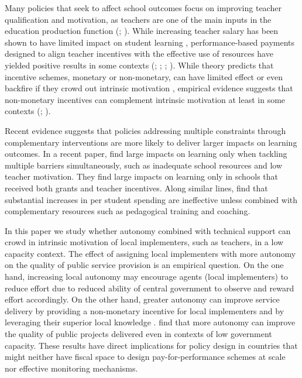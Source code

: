 \documentclass[11pt,a4paper]{article}
\begin{document}
	
	Many policies that seek to affect school outcomes focus on improving teacher qualification and motivation, as teachers are one of the main inputs in the education production function (\citealp{hanushek2008role}; \citealp{chetty2014measuringI, chetty2014measuringII}). While increasing teacher salary has been shown to have limited impact on student learning \citep{de2018double}, performance-based payments designed to align teacher incentives with the effective use of resources have yielded positive results in some contexts (\citealp{muralidharan2011teacher}; \citealp{duflo2012incentives}; \citealp{de2018double}; \citealp{mbiti2019inputs}). While theory predicts that incentive schemes, monetary or non-monetary, can have limited effect or even backfire if they crowd out intrinsic motivation \citep{benabou2006incentives}, empirical evidence suggests that non-monetary incentives can complement intrinsic motivation at least in some contexts (\citealp{bowles2012economic}; \citealp{ashraf2014no}).
	
	
	Recent evidence suggests that policies addressing multiple constraints through complementary interventions are more likely to deliver larger impacts on learning outcomes. In a recent paper, \cite{mbiti2019inputs} find large impacts on learning only when tackling multiple barriers simultaneously, such as inadequate school resources and low teacher motivation. They find large impacts on learning only in schools that received both grants and teacher incentives. Along similar lines, \cite{andrew2019preschool} find that substantial increases in per student spending are ineffective unless combined with complementary resources such as pedagogical training and coaching.
	
	
	In this paper we study whether autonomy combined with technical support can crowd in intrinsic motivation of local implementers, such as teachers, in a low capacity context. The effect of assigning local implementers with more autonomy on the quality of public service provision is an empirical question. On the one hand, increasing local autonomy may encourage agents (local implementers) to reduce effort due to reduced ability of central government to observe and reward effort accordingly. On the other hand, greater autonomy can improve service delivery by providing a non-monetary incentive for local implementers and by leveraging their superior local knowledge \citep{rogger2018hierarchy}. \cite{rasul2018management} find that more autonomy can improve the quality of public projects delivered even in contexts of low government capacity. These results have direct implications for policy design in countries that might neither have fiscal space to design pay-for-performance schemes at scale nor effective monitoring mechanisms. 
	
\end{document}
